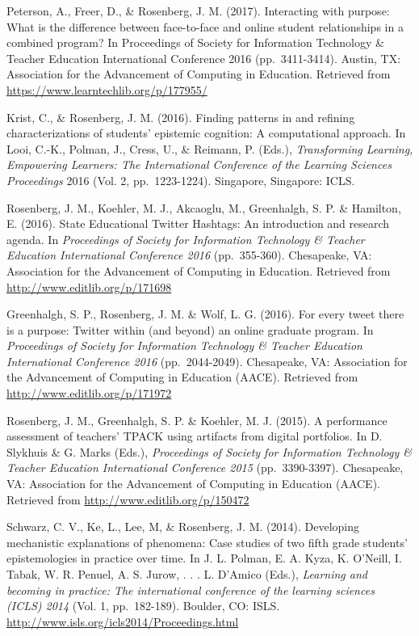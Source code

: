 \documentclass[14,]{article}
\begin{document}
Peterson, A., Freer, D., \& Rosenberg, J. M. (2017). Interacting with
purpose: What is the difference between face-to-face and online student
relationships in a combined program? In Proceedings of Society for
Information Technology \& Teacher Education International Conference
2016 (pp.~3411-3414). Austin, TX: Association for the Advancement of
Computing in Education. Retrieved from
\url{https://www.learntechlib.org/p/177955/}

Krist, C., \& Rosenberg, J. M. (2016). Finding patterns in and refining
characterizations of students' epistemic cognition: A computational
approach. In Looi, C.-K., Polman, J., Cress, U., \& Reimann, P. (Eds.),
\emph{Transforming Learning, Empowering Learners: The International
Conference of the Learning Sciences Proceedings} 2016 (Vol. 2,
pp.~1223-1224). Singapore, Singapore: ICLS.

Rosenberg, J. M., Koehler, M. J., Akcaoglu, M., Greenhalgh, S. P. \&
Hamilton, E. (2016). State Educational Twitter Hashtags: An introduction
and research agenda. In \emph{Proceedings of Society for Information
Technology \& Teacher Education International Conference 2016}
(pp.~355-360). Chesapeake, VA: Association for the Advancement of
Computing in Education. Retrieved from
\url{http://www.editlib.org/p/171698}

Greenhalgh, S. P., Rosenberg, J. M. \& Wolf, L. G. (2016). For every
tweet there is a purpose: Twitter within (and beyond) an online graduate
program. In \emph{Proceedings of Society for Information Technology \&
Teacher Education International Conference 2016} (pp.~2044-2049).
Chesapeake, VA: Association for the Advancement of Computing in
Education (AACE). Retrieved from \url{http://www.editlib.org/p/171972}

Rosenberg, J. M., Greenhalgh, S. P. \& Koehler, M. J. (2015). A
performance assessment of teachers' TPACK using artifacts from digital
portfolios. In D. Slykhuis \& G. Marks (Eds.), \emph{Proceedings of
Society for Information Technology \& Teacher Education International
Conference 2015} (pp.~3390-3397). Chesapeake, VA: Association for the
Advancement of Computing in Education (AACE). Retrieved from
\url{http://www.editlib.org/p/150472}

Schwarz, C. V., Ke, L., Lee, M, \& Rosenberg, J. M. (2014). Developing
mechanistic explanations of phenomena: Case studies of two fifth grade
students' epistemologies in practice over time. In J. L. Polman, E. A.
Kyza, K. O'Neill, I. Tabak, W. R. Penuel, A. S. Jurow, . . . L. D'Amico
(Eds.), \emph{Learning and becoming in practice: The international
conference of the learning sciences (ICLS) 2014} (Vol. 1, pp.~182-189).
Boulder, CO: ISLS. \url{http://www.isls.org/icls2014/Proceedings.html}
\end{document}
